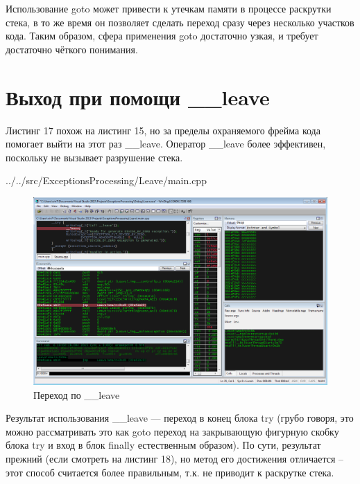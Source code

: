 \documentclass[a4paper, 12pt]{report}		%
\begin{document}


Использование goto может привести к утечкам памяти в процессе раскрутки стека, в то же время он позволяет сделать переход сразу через несколько участков кода. Таким образом, сфера применения goto достаточно узкая, и требует достаточно чёткого понимания.

\chapter*{Выход при помощи \_\_leave}

Листинг 17 похож на листинг 15, но за пределы охраняемого фрейма кода помогает выйти на этот раз \_\_leave. Оператор \_\_leave более эффективен, поскольку не вызывает разрушение стека.


{../../src/ExceptionsProcessing/Leave/main.cpp}

\begin{figure}[h!]
\centering
\includegraphics[scale=0.50]{res/011}
\caption{Переход по \_\_leave}
\end{figure}



Результат использования \_\_leave — переход в конец блока try (грубо говоря, это можно рассматривать это как goto переход на закрывающую фигурную скобку блока try и вход в блок finally естественным образом). По сути, результат прежний (если смотреть на листинг 18), но метод его достижения отличается -- этот способ считается более правильным, т.к. не приводит к раскрутке стека.
\end{document}
